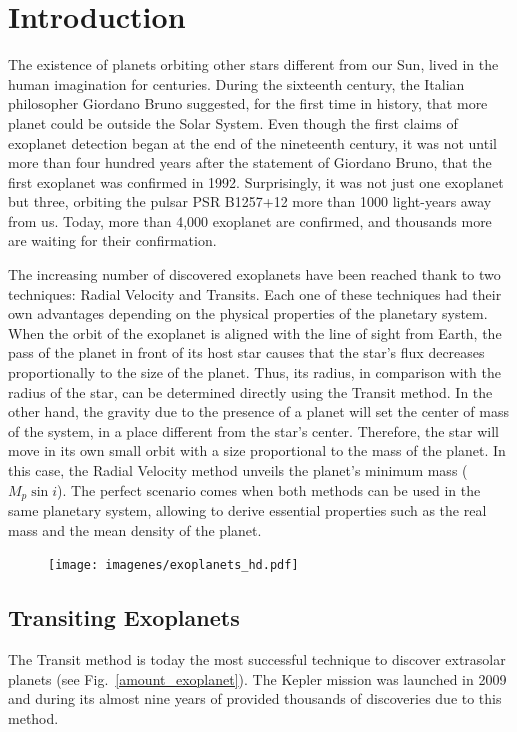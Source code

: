 \chapter{Introduction}\label{chap:intro}
The existence of planets orbiting other stars different from our Sun, lived in the human imagination for centuries. During the sixteenth century, the Italian philosopher Giordano Bruno suggested, for the first time in history, that more planet could be outside the Solar System. Even though the first claims of exoplanet detection began at the end of the nineteenth century, it was not until more than four hundred years after the statement of Giordano Bruno, that the first exoplanet was confirmed in 1992. Surprisingly, it was not just one exoplanet but three, orbiting the pulsar PSR B1257+12 more than 1000 light-years away from us. Today, more than 4,000 exoplanet are confirmed, and thousands more are waiting for their confirmation.

The increasing number of discovered exoplanets have been reached thank to two techniques: Radial Velocity and Transits. Each one of these techniques had their own advantages depending on the physical properties of the planetary system. When the orbit of the exoplanet is aligned with the line of sight from Earth, the pass of the planet in front of its host star causes that the star's flux decreases proportionally to the size of the planet. Thus, its radius, in comparison with the radius of the star, can be determined directly using the Transit method. In the other hand, the gravity due to the presence of a planet will set the center of mass of the system, in a place different from the star's center. Therefore, the star will move in its own small orbit with a size proportional to the mass of the planet. In this case, the Radial Velocity method unveils the planet's minimum mass ($M_{p}\sin i$). The perfect scenario comes when both methods can be used in the same planetary system, allowing to derive essential properties such as the real mass and the mean density of the planet.

\begin{figure}[H]
\centering
\texttt{[image: imagenes/exoplanets\_hd.pdf]}
\caption{}
\label{exoplanets}
\end{figure}

\section{Transiting Exoplanets}
The Transit method is today the most successful technique to discover extrasolar planets (see Fig.~\ref{amount_exoplanet}). The Kepler mission was launched in 2009 and during its almost nine years of provided thousands of discoveries due to this method.

